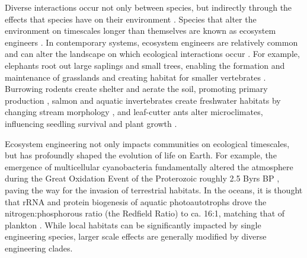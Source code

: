 \documentclass[9pt,twocolumn,twoside]{pnas-new}
\begin{document}
Diverse interactions occur not only between species, but indirectly through the effects that species have on their environment \cite{Jones1994,Olff2009,OdlingSmee2013}.
Species that alter the environment on timescales longer than themselves are known as ecosystem engineers \cite{Hastings2007}.
In contemporary systems, ecosystem engineers are relatively common and can alter the landscape on which ecological interactions occur \cite{Wright2006}.
For example, elephants root out large saplings and small trees, enabling the formation and maintenance of grasslands \cite{Haynes2012} and creating habitat for smaller vertebrates \cite{Pringle2008}.
Burrowing rodents create shelter and aerate the soil, promoting primary production \cite{Reichman2002}, salmon and aquatic invertebrates create freshwater habitats by changing stream morphology \cite{Moore2006}, and leaf-cutter ants alter microclimates, influencing seedling survival and plant growth \cite{Meyer2011}.

Ecosystem engineering not only impacts communities on ecological timescales, but has profoundly shaped the evolution of life on Earth.
For example, the emergence of multicellular cyanobacteria fundamentally altered the atmosphere during the Great Oxidation Event of the Proterozoic roughly 2.5 Byrs BP \cite{Schirrmeister2013}, paving the way for the invasion of terrestrial habitats.
In the oceans, it is thought that rRNA and protein biogenesis of aquatic photoautotrophs drove the nitrogen:phosphorous ratio (the Redfield Ratio) to ca. 16:1, matching that of plankton \cite{Loladze2011}.
While local habitats can be significantly impacted by single engineering species, larger scale effects are generally modified by diverse engineering clades.



% 
\end{document}
